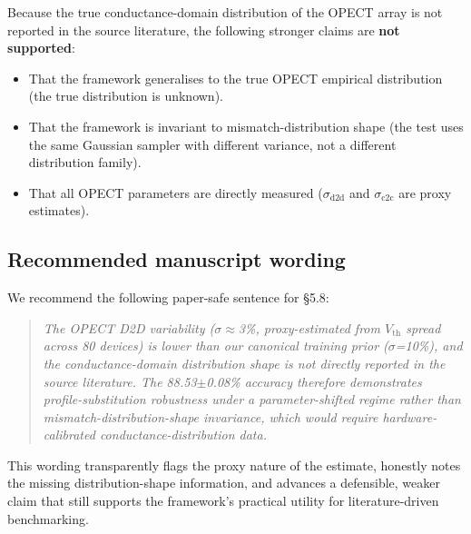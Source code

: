 Because the true conductance-domain distribution of the OPECT array is not reported in the source literature, the following stronger claims are \textbf{not supported}:

\begin{itemize}
\item That the framework generalises to the true OPECT empirical distribution (the true distribution is unknown).
\item That the framework is invariant to mismatch-distribution shape (the test uses the same Gaussian sampler with different variance, not a different distribution family).
\item That all OPECT parameters are directly measured ($\sigma_{\text{d2d}}$ and $\sigma_{\text{c2c}}$ are proxy estimates).
\end{itemize}

\subsection{Recommended manuscript wording}

We recommend the following paper-safe sentence for \S5.8:

\begin{quote}
\textit{The OPECT D2D variability ($\sigma\approx$3\%, proxy-estimated from $V_{\text{th}}$ spread across 80 devices) is lower than our canonical training prior ($\sigma$=10\%), and the conductance-domain distribution shape is not directly reported in the source literature. The 88.53$\pm$0.08\% accuracy therefore demonstrates profile-substitution robustness under a parameter-shifted regime rather than mismatch-distribution-shape invariance, which would require hardware-calibrated conductance-distribution data.}
\end{quote}

This wording transparently flags the proxy nature of the estimate, honestly notes the missing distribution-shape information, and advances a defensible, weaker claim that still supports the framework's practical utility for literature-driven benchmarking.
